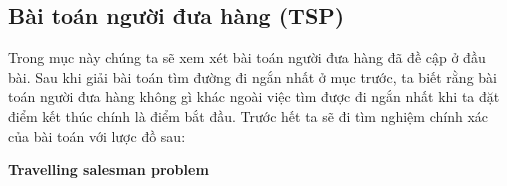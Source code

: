 
\subsection{Bài toán người đưa hàng (TSP)}
Trong mục này chúng ta sẽ xem xét bài toán người đưa hàng đã đề cập ở đầu bài.
Sau khi giải bài toán tìm đường đi ngắn nhất ở mục trước, ta biết rằng bài toán
người đưa hàng không gì khác ngoài việc tìm được đi ngắn nhất khi ta đặt điểm
kết thúc chính là điểm bắt đầu. Trước hết ta sẽ đi tìm nghiệm chính xác của bài toán
với lược đồ sau:

\begin{tcolorbox}[colframe=gray,colback=gray!20,left=10pt,right=10pt,top=10pt,bottom=10pt]
    \textbf{Travelling salesman problem}
\end{tcolorbox}

